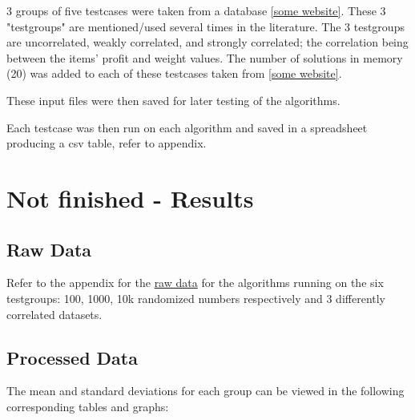 \documentclass[titlepage]{article}
\begin{document}
3 groups of five testcases were taken from a database \ref{some website}. These 3 "testgroups" are mentioned/used several times in the literature. The 3 testgroups are uncorrelated, weakly correlated, and strongly correlated; the correlation being between the items' profit and weight values. The number of solutions in memory (20) was added to each of these testcases taken from \ref{some website}. 

These input files were then saved for later testing of the algorithms. 

Each testcase was then run on each algorithm and saved in a spreadsheet producing a csv table, refer to appendix.

\newpage

\section{Not finished - Results}

\subsection{Raw Data}
Refer to the appendix for the \hyperlink{random100}{raw data} for the algorithms running on the six testgroups: 100, 1000, 10k randomized numbers respectively and 3 differently correlated datasets. 

\subsection{Processed Data}
The mean and standard deviations for each group can be viewed in the following corresponding tables and graphs:
\end{document}
